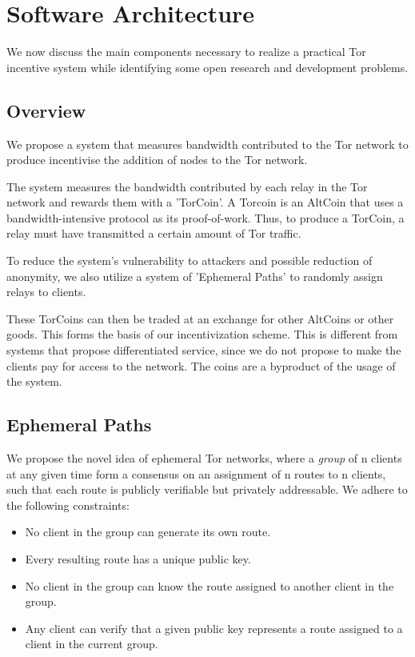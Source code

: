 \section{Software Architecture} \label{arch}

We now discuss the main components necessary to realize a practical Tor
incentive system while identifying some open research and development problems.

\subsection{Overview}
We propose a system that measures bandwidth contributed to the Tor network to produce incentivise the addition of nodes to the Tor network.

The system measures the bandwidth contributed by each relay in the Tor network and rewards them with a 'TorCoin'. A Torcoin is an AltCoin that uses a bandwidth-intensive protocol as its proof-of-work. Thus, to produce a TorCoin, a relay must have transmitted a certain amount of Tor traffic.

To reduce the system's vulnerability to attackers and possible reduction of anonymity, we also utilize a system of 'Ephemeral Paths' to randomly assign relays to clients.

These TorCoins can then be traded at an exchange for other AltCoins or other goods. This forms the basis of our incentivization scheme. This is different from systems that propose differentiated service\cite{dovrolis1999case, dovrolis2002proportional}, since we do not propose to make the clients pay for access to the network. The coins are a byproduct of the usage of the system.

\subsection{Ephemeral Paths}
We propose the novel idea of ephemeral Tor networks, where a \textit{group} of n clients at any given time form a consensus on an assignment of n routes to n clients, such that each route is publicly verifiable but privately addressable. We adhere to the following constraints:
\begin{itemize}
  \item No client in the group can generate its own route.
  \item Every resulting route has a unique public key.
  \item No client in the group can know the route assigned to another client in the group.
  \item Any client can verify that a given public key represents a route assigned to a client in the current group.
\end{itemize}

